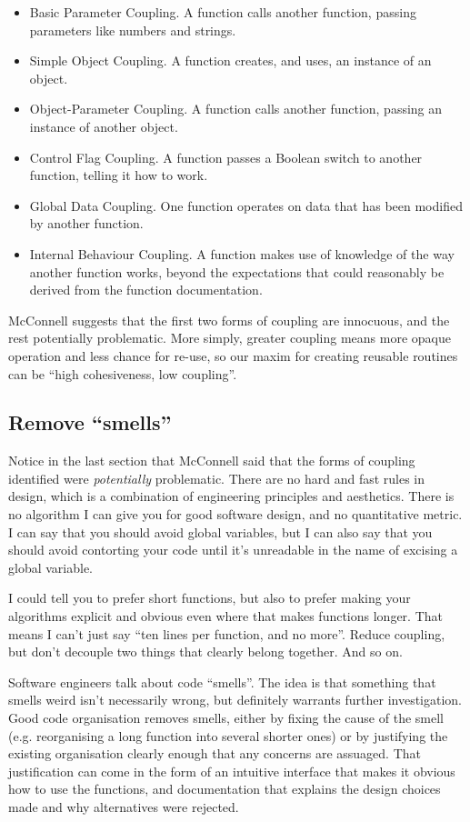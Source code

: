 \documentclass[a4paper]{article}
\begin{document}
\begin{itemize}
\item Basic Parameter Coupling. A function calls another function, passing parameters like numbers and strings.
\item Simple Object Coupling. A function creates, and uses, an instance of an object.
\item Object-Parameter Coupling. A function calls another function, passing an instance of another object.
\item Control Flag Coupling. A function passes a Boolean switch to another function, telling it how to work.
\item Global Data Coupling. One function operates on data that has been modified by another function.
\item Internal Behaviour Coupling. A function makes use of knowledge of the way another function works, beyond the expectations that could reasonably be derived from the function documentation.
\end{itemize}

McConnell suggests that the first two forms of coupling are innocuous, and the rest potentially problematic.
More simply, greater coupling means more opaque operation and less chance for re-use, so our maxim for creating reusable routines can be ``high cohesiveness, low coupling''.

\subsection{Remove ``smells''}

Notice in the last section that McConnell said that the forms of coupling identified were \emph{potentially} problematic.
There are no hard and fast rules in design, which is a combination of engineering principles and aesthetics.
There is no algorithm I can give you for good software design, and no quantitative metric.
I can say that you should avoid global variables, but I can also say that you should avoid contorting your code until it's unreadable in the name of excising a global variable.

I could tell you to prefer short functions, but also to prefer making your algorithms explicit and obvious even where that makes functions longer.
That means I can't just say ``ten lines per function, and no more''.
Reduce coupling, but don't decouple two things that clearly belong together.
And so on.

Software engineers talk about code ``smells''\cite{chsmell}.
The idea is that something that smells weird isn't necessarily wrong, but definitely warrants further investigation.
Good code organisation removes smells, either by fixing the cause of the smell (e.g.
reorganising a long function into several shorter ones) or by justifying the existing organisation clearly enough that any concerns are assuaged.
That justification can come in the form of an intuitive interface that makes it obvious how to use the functions, and documentation that explains the design choices made and why alternatives were rejected.
\end{document}
